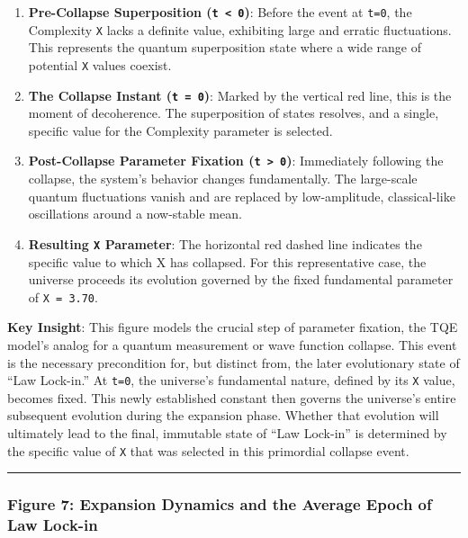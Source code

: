 \begin{enumerate}
\def\labelenumi{\arabic{enumi}.}
\item
  \textbf{Pre-Collapse Superposition (\texttt{t\ \textless{}\ 0})}:
  Before the event at \texttt{t=0}, the Complexity \texttt{X} lacks a
  definite value, exhibiting large and erratic fluctuations. This
  represents the quantum superposition state where a wide range of
  potential \texttt{X} values coexist.
\item
  \textbf{The Collapse Instant (\texttt{t\ =\ 0})}: Marked by the
  vertical red line, this is the moment of decoherence. The
  superposition of states resolves, and a single, specific value for the
  Complexity parameter is selected.
\item
  \textbf{Post-Collapse Parameter Fixation
  (\texttt{t\ \textgreater{}\ 0})}: Immediately following the collapse,
  the system's behavior changes fundamentally. The large-scale quantum
  fluctuations vanish and are replaced by low-amplitude, classical-like
  oscillations around a now-stable mean.
\item
  \textbf{Resulting \texttt{X} Parameter}: The horizontal red dashed
  line indicates the specific value to which X has collapsed. For this
  representative case, the universe proceeds its evolution governed by
  the fixed fundamental parameter of \texttt{X\ =\ 3.70}.
\end{enumerate}

\textbf{Key Insight}: This figure models the crucial step of parameter
fixation, the TQE model's analog for a quantum measurement or wave
function collapse. This event is the necessary precondition for, but
distinct from, the later evolutionary state of ``Law Lock-in.'' At
\texttt{t=0}, the universe's fundamental nature, defined by its
\texttt{X} value, becomes fixed. This newly established constant then
governs the universe's entire subsequent evolution during the expansion
phase. Whether that evolution will ultimately lead to the final,
immutable state of ``Law Lock-in'' is determined by the specific value
of \texttt{X} that was selected in this primordial collapse event.

\begin{center}\rule{0.5\linewidth}{0.5pt}\end{center}

\subsubsection{Figure 7: Expansion Dynamics and the Average Epoch of Law
Lock-in}\label{figure-7-expansion-dynamics-and-the-average-epoch-of-law-lock-in}

